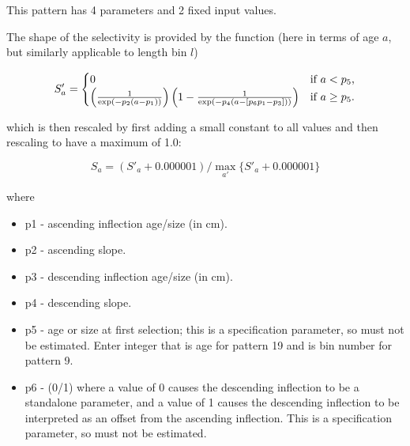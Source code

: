 
This pattern has 4 parameters and 2 fixed input values.

The shape of the selectivity is provided by the function (here in terms of age $a$, but similarly applicable to length bin $l$)

\begin{equation}
    S'_a =  
    \begin{cases}
      \hfil 0 & \text{if $a < p_5$,} \\
      \left( \frac{1}{\exp\left(-p_2 \left( a - p_1 \right) \right) } \right)
      \left(1 - \frac{1}{\exp\left(-p_4 \left( a - [p_6 p_1 - p_3]\right) \right) } \right)
      & \text{if $a \geq p_5$.}
    \end{cases}
 \end{equation}

 which is then rescaled by first adding a small constant to all values and then rescaling to have a maximum of 1.0:
 
 \begin{equation}
    S_a = (S'_a + 0.000001) / \max_{a'}\{S'_a + 0.000001\}
 \end{equation}

  where
	\begin{itemize}
		\item p1 - ascending inflection age/size (in cm).
		\item p2 - ascending slope. 
		\item p3 - descending inflection age/size (in cm).
		\item p4 - descending slope.
		\item p5 - age or size at first selection; this is a specification parameter, so must not be estimated. Enter integer that is age for pattern 19 and is bin number for pattern 9.
		\item p6 - (0/1) where a value of 0 causes the descending inflection to be a standalone parameter, and a value of 1 causes the descending inflection to be interpreted as an offset from the ascending inflection. This is a specification parameter, so must not be estimated.
	\end{itemize}

